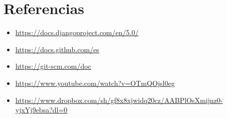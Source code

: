 \documentclass{article}
\begin{document}
	
  \newpage
  \section{Referencias}
  \begin{itemize}
    \item \url{https://docs.djangoproject.com/en/5.0/}
    \item \url{https://docs.github.com/es}
    \item \url{https://git-scm.com/doc}
    \item \url{https://www.youtube.com/watch?v=OTmQOjsl0eg}
    \item \url{https://www.dropbox.com/sh/gf8x8xjwidq20cz/AABPlOsXmijnz0-yjxYj9ebsa?dl=0}
  \end{itemize}

%
%
%
			
\end{document}
